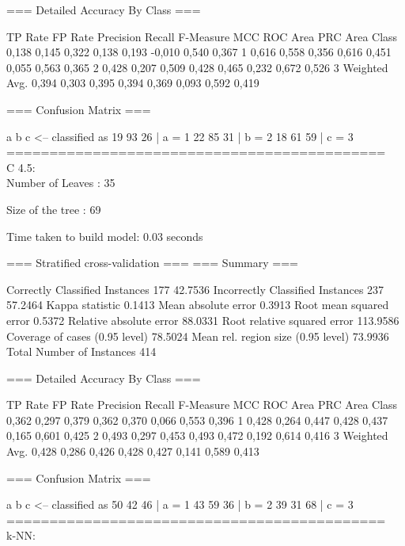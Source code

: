 \documentclass[12pt,a4paper,titlepage]{report}
\begin{document}
=== Detailed Accuracy By Class ===

                 TP Rate  FP Rate  Precision  Recall   F-Measure  MCC      ROC Area  PRC Area  Class
                 0,138    0,145    0,322      0,138    0,193      -0,010   0,540     0,367     1
                 0,616    0,558    0,356      0,616    0,451      0,055    0,563     0,365     2
                 0,428    0,207    0,509      0,428    0,465      0,232    0,672     0,526     3
Weighted Avg.    0,394    0,303    0,395      0,394    0,369      0,093    0,592     0,419     

=== Confusion Matrix ===

  a  b  c   <-- classified as
 19 93 26 |  a = 1
 22 85 31 |  b = 2
 18 61 59 |  c = 3
============================================\\
C 4.5:\\

Number of Leaves  : 	35

Size of the tree : 	69


Time taken to build model: 0.03 seconds

=== Stratified cross-validation ===
=== Summary ===

Correctly Classified Instances         177               42.7536 %
Incorrectly Classified Instances       237               57.2464 %
Kappa statistic                          0.1413
Mean absolute error                      0.3913
Root mean squared error                  0.5372
Relative absolute error                 88.0331 %
Root relative squared error            113.9586 %
Coverage of cases (0.95 level)          78.5024 %
Mean rel. region size (0.95 level)      73.9936 %
Total Number of Instances              414     

=== Detailed Accuracy By Class ===

                 TP Rate  FP Rate  Precision  Recall   F-Measure  MCC      ROC Area  PRC Area  Class
                 0,362    0,297    0,379      0,362    0,370      0,066    0,553     0,396     1
                 0,428    0,264    0,447      0,428    0,437      0,165    0,601     0,425     2
                 0,493    0,297    0,453      0,493    0,472      0,192    0,614     0,416     3
Weighted Avg.    0,428    0,286    0,426      0,428    0,427      0,141    0,589     0,413     

=== Confusion Matrix ===

  a  b  c   <-- classified as
 50 42 46 |  a = 1
 43 59 36 |  b = 2
 39 31 68 |  c = 3
 ============================================\\
k-NN:\\
\end{document}
